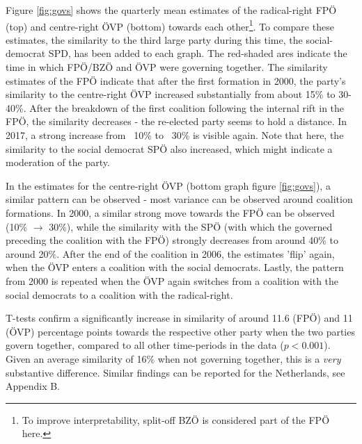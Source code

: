 \documentclass{article}
\begin{document}
Figure \ref{fig:govs} shows the quarterly mean estimates of the radical-right FPÖ (top) and centre-right ÖVP (bottom) towards each other\footnote{To improve interpretability, split-off BZÖ is considered part of the FPÖ here.}. To compare these estimates, the similarity to the third large party during this time, the social-democrat SPD, has been added to each graph. The red-shaded ares indicate the time in which FPÖ/BZÖ and ÖVP were governing together. The similarity estimates of the FPÖ indicate that after the first formation in 2000, the party's similarity to the centre-right ÖVP increased substantially from about 15\% to 30-40\%. After the breakdown of the first coalition following the internal rift in the FPÖ, the similarity decreases - the re-elected party seems to hold a distance. In 2017, a strong increase from ~10\% to ~30\% is visible again. Note that here, the similarity to the social democrat SPÖ also increased, which might indicate a moderation of the party.\par


In the estimates for the centre-right ÖVP (bottom graph figure \ref{fig:govs}), a similar pattern can be observed - most variance can be observed around coalition formations. In 2000, a similar strong move towards the FPÖ can be observed (10\% $\rightarrow$ 30\%), while the similarity with the SPÖ (with which the governed preceding the coalition with the FPÖ) strongly decreases from around 40\% to around 20\%. After the end of the coalition in 2006, the estimates 'flip' again, when the ÖVP enters a coalition with the social democrats. Lastly, the pattern from 2000 is repeated when the ÖVP again switches from a coalition with the social democrats to a coalition with the radical-right.\par

T-tests confirm a significantly increase in similarity of around 11.6 (FPÖ) and 11 (ÖVP) percentage points towards the respective other party when the two parties govern together, compared to all other time-periods in the data ($p<0.001$). Given an average similarity of 16\% when not governing together, this is a \textit{very} substantive difference. Similar findings can be reported for the Netherlands, see Appendix B.\par
\end{document}
